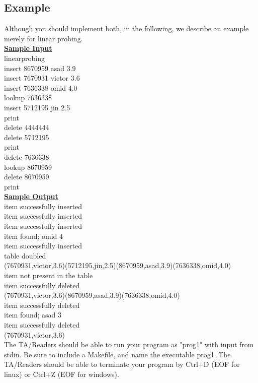 \documentclass[times, 12pt]{article}
\begin{document}
\subsection*{Example}
Although you should implement both, in the following, we describe an example merely for linear probing.\\
\underline{\textbf{Sample Input}}\\
linearprobing\\
insert 8670959 asad 3.9\\
insert 7670931 victor 3.6\\
insert 7636338 omid 4.0\\
lookup 7636338\\
insert 5712195 jin 2.5\\
print\\
delete 4444444\\
delete 5712195\\
print\\
delete 7636338\\
lookup 8670959\\
delete 8670959\\
print\\

\noindent\underline{\textbf{Sample Output}}\\
item successfully inserted\\
item successfully inserted\\
item successfully inserted\\
item found; omid 4\\
item successfully inserted\\
table doubled\\
(7670931,victor,3.6)(5712195,jin,2.5)(8670959,asad,3.9)(7636338,omid,4.0)\\
item not present in the table\\
item successfully deleted\\
(7670931,victor,3.6)(8670959,asad,3.9)(7636338,omid,4.0)\\
item successfully deleted\\
item found; asad 3\\
item successfully deleted\\
(7670931,victor,3.6)\\

The TA/Readers should be able to run your program as "prog1" with input from stdin. Be sure to include a Makefile, and name the executable prog1. The TA/Readers should be able to terminate your program by Ctrl+D (EOF for linux) or Ctrl+Z (EOF for windows).\\
\end{document}
